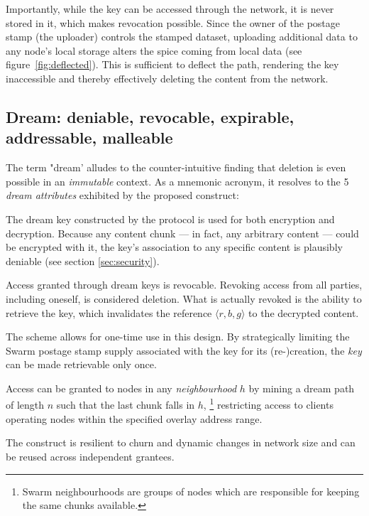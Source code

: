 \documentclass[singlecolumn]{acmart}
\begin{document}
Importantly, while the key can be accessed through the network, it is never stored in it, which makes revocation possible. Since the owner of the postage stamp (the uploader) controls the stamped dataset, uploading additional data to any node's local storage alters the spice coming from local data (see figure~\ref{fig:deflected}). This is sufficient to deflect the path, rendering the key inaccessible and thereby effectively deleting the content from the network. 

\subsection{Dream: deniable, revocable, expirable, addressable, malleable}

The term "dream' alludes to the counter-intuitive finding that deletion is even possible in an \emph{immutable} context.  As a mnemonic acronym, it resolves to the 5 \emph{dream attributes} exhibited by the proposed construct:

\begin{labelledlist}

    \item[\textbf{D} \emph{deniable}] The dream key constructed by the protocol is used for both encryption and decryption. Because any content chunk — in fact, any arbitrary content — could be encrypted with it, the key's association to any specific content is plausibly deniable (see section \ref{sec:security}).

    \item[\textbf{R} \emph{revocable}] Access granted through dream keys is revocable. Revoking access from all parties, including oneself, is considered deletion. What is actually revoked is the ability to retrieve the key, which invalidates the reference $\langle r,b,g\rangle $ to the decrypted content.

    \item[\textbf{E} \emph{expirable}] The scheme allows for one-time use in this design. By strategically limiting the Swarm postage stamp supply associated with the key for its (re-)creation, the \emph{key} can be made retrievable only once. 
    
    \item[\textbf{A} \emph{addressable}] Access can be granted to nodes in any \emph{neighbourhood} $h$ by mining a dream path of length $n$ such that the last chunk falls in $h$,%
%
    \footnote{Swarm neighbourhoods are groups of nodes which are responsible for keeping the same chunks available\cite{swarm2021whitepaper}.}
%
    restricting access to clients operating nodes within the specified overlay address range.
    
    \item[\textbf{M} \emph{malleable}]   The construct is resilient to churn and dynamic changes in network size and can be reused across independent grantees.

\end{labelledlist}
\end{document}
